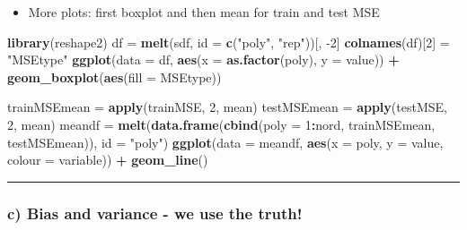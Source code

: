 \documentclass[]{article}
\newenvironment{Shaded}{\begin{snugshade}}{\end{snugshade}}
\newcommand{\KeywordTok}[1]{\textcolor[rgb]{0.13,0.29,0.53}{\textbf{#1}}}
\newcommand{\DataTypeTok}[1]{\textcolor[rgb]{0.13,0.29,0.53}{#1}}
\newcommand{\DecValTok}[1]{\textcolor[rgb]{0.00,0.00,0.81}{#1}}
\newcommand{\StringTok}[1]{\textcolor[rgb]{0.31,0.60,0.02}{#1}}
\newcommand{\OperatorTok}[1]{\textcolor[rgb]{0.81,0.36,0.00}{\textbf{#1}}}
\newcommand{\NormalTok}[1]{#1}
\providecommand{\tightlist}{%
  \setlength{\itemsep}{0pt}\setlength{\parskip}{0pt}}
\begin{document}
\begin{itemize}
\tightlist
\item
  More plots: first boxplot and then mean for train and test MSE
\end{itemize}

\begin{Shaded}
\begin{Highlighting}[]
\KeywordTok{library}\NormalTok{(reshape2)}
\NormalTok{df =}\StringTok{ }\KeywordTok{melt}\NormalTok{(sdf, }\DataTypeTok{id =} \KeywordTok{c}\NormalTok{(}\StringTok{"poly"}\NormalTok{, }\StringTok{"rep"}\NormalTok{))[, }\DecValTok{-2}\NormalTok{]}
\KeywordTok{colnames}\NormalTok{(df)[}\DecValTok{2}\NormalTok{] =}\StringTok{ "MSEtype"}
\KeywordTok{ggplot}\NormalTok{(}\DataTypeTok{data =}\NormalTok{ df, }\KeywordTok{aes}\NormalTok{(}\DataTypeTok{x =} \KeywordTok{as.factor}\NormalTok{(poly), }\DataTypeTok{y =}\NormalTok{ value)) }\OperatorTok{+}\StringTok{ }\KeywordTok{geom_boxplot}\NormalTok{(}\KeywordTok{aes}\NormalTok{(}\DataTypeTok{fill =}\NormalTok{ MSEtype))}
\end{Highlighting}
\end{Shaded}

\begin{Shaded}
\begin{Highlighting}[]
\NormalTok{trainMSEmean =}\StringTok{ }\KeywordTok{apply}\NormalTok{(trainMSE, }\DecValTok{2}\NormalTok{, mean)}
\NormalTok{testMSEmean =}\StringTok{ }\KeywordTok{apply}\NormalTok{(testMSE, }\DecValTok{2}\NormalTok{, mean)}
\NormalTok{meandf =}\StringTok{ }\KeywordTok{melt}\NormalTok{(}\KeywordTok{data.frame}\NormalTok{(}\KeywordTok{cbind}\NormalTok{(}\DataTypeTok{poly =} \DecValTok{1}\OperatorTok{:}\NormalTok{nord, trainMSEmean, testMSEmean)), }
    \DataTypeTok{id =} \StringTok{"poly"}\NormalTok{)}
\KeywordTok{ggplot}\NormalTok{(}\DataTypeTok{data =}\NormalTok{ meandf, }\KeywordTok{aes}\NormalTok{(}\DataTypeTok{x =}\NormalTok{ poly, }\DataTypeTok{y =}\NormalTok{ value, }\DataTypeTok{colour =}\NormalTok{ variable)) }\OperatorTok{+}\StringTok{ }
\StringTok{    }\KeywordTok{geom_line}\NormalTok{()}
\end{Highlighting}
\end{Shaded}

\begin{center}\rule{0.5\linewidth}{\linethickness}\end{center}

\subsubsection{c) Bias and variance - we use the
truth!}\label{c-bias-and-variance---we-use-the-truth}
\end{document}
